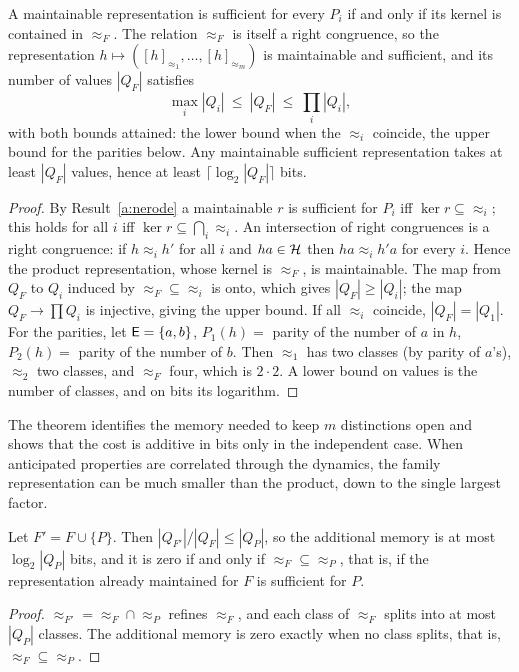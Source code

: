\begin{newresult}\label{thm:family}
A maintainable representation is sufficient for every $P_i$ if and only if its kernel is contained in $\approx_F$. The relation $\approx_F$ is itself a right congruence, so the representation $h\mapsto([h]_{\approx_1},\dots,[h]_{\approx_m})$ is maintainable and sufficient, and its number of values $|Q_F|$ satisfies
\[
\max_i|Q_i|\ \le\ |Q_F|\ \le\ \prod_i|Q_i|,
\]
with both bounds attained: the lower bound when the $\approx_i$ coincide, the upper bound for the parities below. Any maintainable sufficient representation takes at least $|Q_F|$ values, hence at least $\lceil\log_2|Q_F|\rceil$ bits.
\end{newresult}
\begin{proof}
By Result~\ref{a:nerode} a maintainable $r$ is sufficient for $P_i$ iff $\ker r\subseteq{\approx_i}$; this holds for all $i$ iff $\ker r\subseteq\bigcap_i{\approx_i}$. An intersection of right congruences is a right congruence: if $h\approx_ih'$ for all $i$ and $ha\in\mathcal{H}$ then $ha\approx_ih'a$ for every $i$. Hence the product representation, whose kernel is $\approx_F$, is maintainable. The map from $Q_F$ to $Q_i$ induced by $\approx_F\subseteq\approx_i$ is onto, which gives $|Q_F|\ge|Q_i|$; the map $Q_F\to\prod Q_i$ is injective, giving the upper bound. If all $\approx_i$ coincide, $|Q_F|=|Q_1|$. For the parities, let $\mathsf{E}=\{a,b\}$, $P_1(h)=$ parity of the number of $a$ in $h$, $P_2(h)=$ parity of the number of $b$. Then $\approx_1$ has two classes (by parity of $a$'s), $\approx_2$ two classes, and $\approx_F$ four, which is $2\cdot 2$. A lower bound on values is the number of classes, and on bits its logarithm.
\end{proof}

The theorem identifies the memory needed to keep $m$ distinctions open and shows that the cost is additive in bits only in the independent case. When anticipated properties are correlated through the dynamics, the family representation can be much smaller than the product, down to the single largest factor.

\begin{newresult}\label{prop:marginal}
Let $F'=F\cup\{P\}$. Then $|Q_{F'}|/|Q_F|\le|Q_P|$, so the additional memory is at most $\log_2|Q_P|$ bits, and it is zero if and only if ${\approx_F}\subseteq{\approx_P}$, that is, if the representation already maintained for $F$ is sufficient for $P$.
\end{newresult}
\begin{proof}
$\approx_{F'}=\approx_F\cap\approx_P$ refines $\approx_F$, and each class of $\approx_F$ splits into at most $|Q_P|$ classes. The additional memory is zero exactly when no class splits, that is, ${\approx_F}\subseteq{\approx_P}$.
\end{proof}

